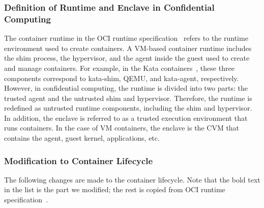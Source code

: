 \subsubsection{Definition of Runtime and Enclave in Confidential Computing}

The container runtime in the OCI runtime specification~\cite*{oci-runtime-spec} refers to the runtime environment used to create containers. A VM-based container runtime includes the shim process, the hypervisor, and the agent inside the guest used to create and manage containers. 
For example, in the Kata containers~\cite*{Kata-Containers}, these three components correspond to kata-shim, QEMU, and kata-agent, respectively. However, in confidential computing, the runtime is divided into two parts: the trusted agent and the untrusted shim and hypervisor. Therefore, the runtime is redefined
as untrusted runtime components, including the shim and hypervisor. In addition, the enclave is referred to as a trusted execution environment that runs containers. In the case of VM containers, the enclave is the  CVM that contains the agent, guest kernel, applications, etc.

\subsubsection{Modification to Container Lifecycle}
The following changes are made to the container lifecycle. Note that the bold text in the list is the part we modified; the rest is copied from OCI runtime specification~\cite*{oci-runtime-spec}.

